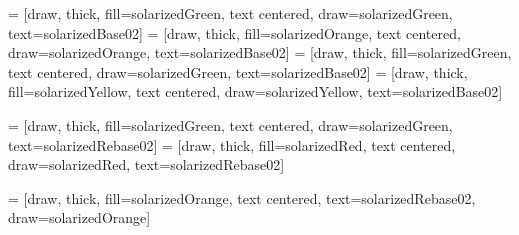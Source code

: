  = [draw, thick, fill=solarizedGreen, text centered, draw=solarizedGreen,
    text=solarizedBase02]
 = [draw, thick, fill=solarizedOrange, text centered, draw=solarizedOrange,
    text=solarizedBase02]
 = [draw, thick, fill=solarizedGreen, text centered, draw=solarizedGreen,
    text=solarizedBase02]
 = [draw, thick, fill=solarizedYellow, text centered, draw=solarizedYellow,
    text=solarizedBase02]

 = [draw, thick, fill=solarizedGreen, text centered, draw=solarizedGreen, text=solarizedRebase02]
 = [draw, thick, fill=solarizedRed, text centered, draw=solarizedRed, text=solarizedRebase02]

 = [draw, thick, fill=solarizedOrange, text centered, text=solarizedRebase02, draw=solarizedOrange]
